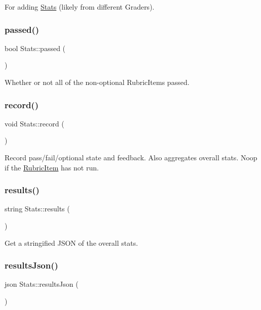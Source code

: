 For adding \hyperlink{class_stats}{Stats} (likely from different Graders). \hypertarget{class_stats_aeadd76aff06c7e684370251d2e75abf3}{}\label{class_stats_aeadd76aff06c7e684370251d2e75abf3} 
\subsubsection{\texorpdfstring{passed()}{passed()}}
{\footnotesize\ttfamily bool Stats\+::passed (\begin{DoxyParamCaption}{ }\end{DoxyParamCaption})}

Whether or not all of the non-\/optional Rubric\+Items passed. \hypertarget{class_stats_ad80ca89a4ce1578b41d0b64b873457af}{}\label{class_stats_ad80ca89a4ce1578b41d0b64b873457af} 
\subsubsection{\texorpdfstring{record()}{record()}}
{\footnotesize\ttfamily void Stats\+::record (\begin{DoxyParamCaption}\item[{std\+::shared\+\_\+ptr$<$ \hyperlink{class_rubric_item}{Rubric\+Item} $>$}]{ }\end{DoxyParamCaption})}

Record pass/fail/optional state and feedback. Also aggregates overall stats. Noop if the \hyperlink{class_rubric_item}{Rubric\+Item} has not run. \hypertarget{class_stats_a0c05e0e2304a9ac271fc0e95493c9aeb}{}\label{class_stats_a0c05e0e2304a9ac271fc0e95493c9aeb} 
\subsubsection{\texorpdfstring{results()}{results()}}
{\footnotesize\ttfamily string Stats\+::results (\begin{DoxyParamCaption}{ }\end{DoxyParamCaption})}

Get a stringified J\+S\+ON of the overall stats. \hypertarget{class_stats_a6d0361dcb25186d1d168009a66cb675d}{}\label{class_stats_a6d0361dcb25186d1d168009a66cb675d} 
\subsubsection{\texorpdfstring{results\+Json()}{resultsJson()}}
{\footnotesize\ttfamily json Stats\+::results\+Json (\begin{DoxyParamCaption}{ }\end{DoxyParamCaption})}

